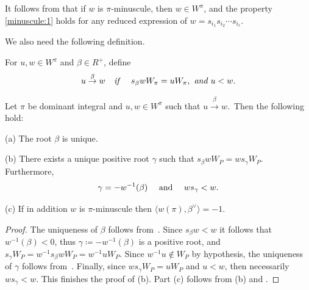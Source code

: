 \begin{remark}\label{rem:wminuscule}
	It follows from  that if $w$ is $\pi$-minuscule, then $w\in W^\pi$,
	and
	the property \eqref{minuscule:1} holds for any reduced expression 
	of $w=s_{i_1} s_{i_2}\cdots s_{i_\ell}$.
\end{remark}
We also need the following definition.
\begin{defin}\label{defin:order}
	For $u,w\in W^\pi$ and $\beta\in R^{+}$, define 
	\begin{equation*}\label{equ:order}
		u \overset{\beta}{\to} w \textit{\quad if \quad}  s_\beta wW_\pi=uW_\pi, \textit{ and }u<w.
	\end{equation*}
\end{defin}
\begin{lemma}\label{lemma:ubetav} Let $\pi$ be dominant integral and $u,w \in W^\pi$ such that 
	$u \overset{\beta}{\to} w$.~Then the following hold:
	
	(a) The root $\beta$ is unique.
	
	(b) There exists a unique positive root $\gamma$ such that $s_\beta w W_P = w s_\gamma W_P$.
	Furthermore, 
	\[ \gamma= - w^{-1}(\beta) \quad \textrm{ and } \quad ws_\gamma < w \/. \]
		
	(c) If in addition $w$ is $\pi$-minuscule then $\langle w(\pi), \beta^\vee \rangle = -1$.
\end{lemma}
\begin{proof} The uniqueness of $\beta$ follows from~\cite[Lemma 4.1]{fulton.woodward}. Since 
	$s_\beta w <w$ it follows that $w^{-1}(\beta)<0$, thus $\gamma\coloneqq  - w^{-1}(\beta)$ is a positive root,
	and $s_\gamma W_P = w^{-1} s_\beta w W_P = w^{-1} u W_P$. Since $w^{-1}u \notin W_P$ by hypothesis, the uniqueness of $\gamma$ follows from~\cite[Lemma 2.2]{buch.m:nbhds}. 
	Finally, since $ws_\gamma W_P = u W_P$ and $u <w$, then necessarily
	$ws_\gamma < w$. This finishes the proof of (b). Part (c) follows from (b) and .
\end{proof}


